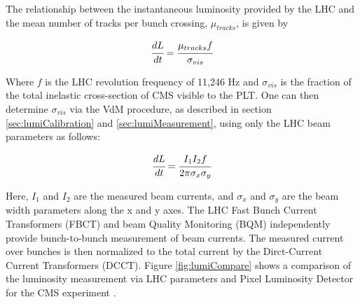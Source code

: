 
The relationship between the instantaneous luminosity provided by the LHC and the mean number of tracks per bunch crossing, $\mu_{tracks}$, is given by


$$\cfrac{dL}{dt} = \cfrac{\mu_{tracks}f} {\sigma_{vis}}$$

\noindent
Where $f$ is the LHC revolution frequency of 11,246 Hz and $\sigma_{vis}$ is the fraction of the total inelastic cross-section of CMS visible to the PLT.  One can then determine $\sigma_{vis}$ via the VdM procedure, as described in section \ref{sec:lumiCalibration} and \ref{sec:lumiMeasurement}, using only the LHC beam parameters as follows:

$$\cfrac{dL}{dt} = \cfrac{I_{1}I_{2}f}{2\pi\sigma_{x}\sigma_{y}}$$

Here, $I_{1}$ and $I_{2}$ are the measured beam currents, and $\sigma_{x}$ and $\sigma_{y}$ are the beam width parameters along the x and y axes.  The LHC Fast Bunch Current Transformers (FBCT) and beam Quality Monitoring (BQM) independently provide bunch-to-bunch measurement of beam currents. The measured current over bunches is then normalized to the total current by the Dirct-Current Current Transformers (DCCT). Figure \ref{fig:lumiCompare} shows a comparison of the luminosity measurement via LHC parameters and Pixel Luminosity Detector for the CMS experiment \cite{PLT:AN-16-002_v3}.



